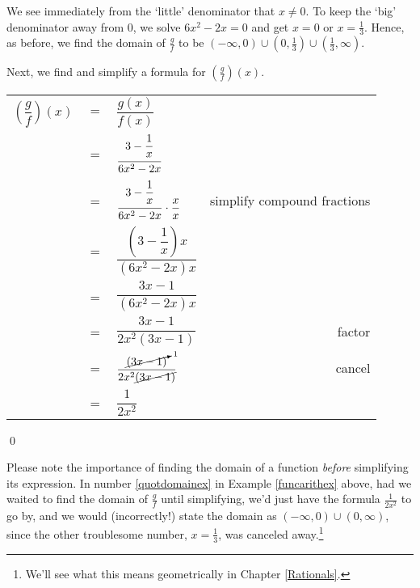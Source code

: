 \begin{ex}
\begin{enumerate}
We see immediately from the `little' denominator that $x \neq 0$.  To keep the `big' denominator away from $0$, we solve $6x^2 - 2x = 0$ and get $x = 0$ or $x = \frac{1}{3}$.  Hence, as before, we find the domain of $\frac{g}{f}$ to be $(-\infty, 0) \cup \left(0, \frac{1}{3}\right) \cup \left(\frac{1}{3}, \infty\right)$.

Next, we find and simplify a formula for $\left(\frac{g}{f}\right)(x)$.

\setlength{\extrarowheight}{12pt}

\begin{longtable}{rclr}
 
$\left( \dfrac{g}{f}\right)(x)$ & $=$ & $\dfrac{g(x)}{f(x)} $  & \\
& = & $\dfrac{3-\dfrac{1}{x}\vphantom{\left(\dfrac{1}{x}\right)}}{6x^2 - 2x}$ & \\[.125in]
& = & $\dfrac{3-\dfrac{1}{x}\vphantom{\left(\dfrac{1}{x}\right)}}{6x^2 - 2x} \cdot \dfrac{x}{x}$ & simplify compound fractions  \\[.125in]
& = & $\dfrac{\left(3-\dfrac{1}{x}\right) x}{\left(6x^2 - 2x\right)x}$ & \\
& = & $\dfrac{3x-1}{\left(6x^2 - 2x\right)x}$ & \\
& = & $\dfrac{3x-1}{2x^2(3x-1)}$ & factor \\
& = & $\dfrac{\cancelto{1}{(3x-1)}}{2x^2\cancel{(3x-1)}}$ & cancel \\
& = & $\dfrac{1}{2x^2}$ &  \\

\end{longtable} 

\setlength{\extrarowheight}{2pt}

\end{enumerate}

\end{ex}

\vspace{-.35in} \qed

Please note the importance of finding the domain of a function \textit{before} simplifying its expression.  In number \ref{quotdomainex} in Example \ref{funcarithex} above, had we waited to find the domain of $\frac{g}{f}$ until  simplifying, we'd just have the formula $\frac{1}{2x^2}$ to go by, and we would (incorrectly!) state the domain as $(-\infty, 0) \cup (0,\infty)$, since the other troublesome number, $x = \frac{1}{3}$, was canceled away.\footnote{We'll see what this means geometrically in Chapter \ref{Rationals}.}

